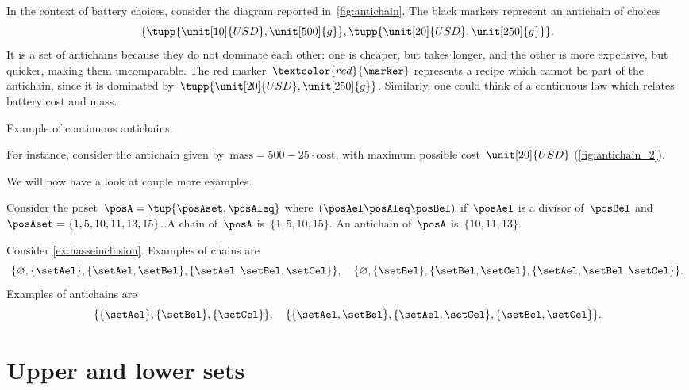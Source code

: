 In the context of battery choices, consider the diagram reported in~\cref{fig:antichain}.
The black markers represent an antichain of choices
\begin{equation}
    \{
    \tupp{\unit[10]{USD},\unit[500]{g}},
    \tupp{\unit[20]{USD},\unit[250]{g}}\}.
\end{equation}
It is a set of antichains because they do not dominate each other: one is cheaper, but takes longer, and the other is more expensive, but quicker, making them uncomparable.
The red marker~$\textcolor{red}{\marker}$ represents a recipe which cannot be part of the antichain, since it is dominated by~$\tupp{\unit[20]{USD},\unit[250]{g}}$.
Similarly, one could think of a continuous law which relates battery cost and mass.
%
\begin{marginfigure}
    \centering
    \caption{Example of continuous antichains.}
    \label{fig:antichain_2}
\end{marginfigure}
%
For instance, consider the antichain given by~$\text{mass}=500-25\cdot \text{cost}$, with maximum possible cost~$\unit[20]{USD}$ (\cref{fig:antichain_2}).

We will now have a look at couple more examples.
\begin{example}
    Consider the poset~$\posA=\tup{\posAset,\posAleq}$ where~$(\posAel \posAleq \posBel)$ if~$\posAel$ is a divisor of~$\posBel$ and~$\posAset=\{1,5,10,11,13,15\}$.
    A chain of~$\posA$ is~$\{1,5,10,15\}$.
    An antichain of~$\posA$ is~$\{10,11,13\}$.
\end{example}

\begin{example}
    Consider \cref{ex:hasseinclusion}.
    Examples of chains are
    \begin{equation}
        \{\varnothing,\{\setAel\},\{\setAel,\setBel\},\{\setAel,\setBel,\setCel\}\}, \quad  \{\varnothing,\{\setBel\},\{\setBel,\setCel\},\{\setAel,\setBel,\setCel\}\}.
    \end{equation}
    Examples of antichains are
    \begin{equation}
        \{\{\setAel\},\{\setBel\},\{\setCel\}\}, \quad \{ \{\setAel,\setBel\},\{\setAel,\setCel\}, \{\setBel,\setCel\}\}.
    \end{equation}
\end{example}

\section{Upper and lower sets}
\label{sec:UpperLowerSets}

